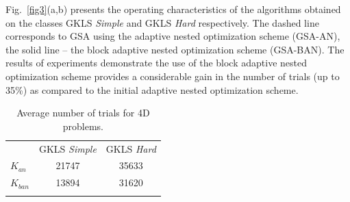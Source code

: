 \documentclass[runningheads]{llncs}
\begin{document}
Fig.~\ref{fig3}(a,b) presents the operating characteristics of the algorithms obtained on the classes GKLS \textit{Simple} 
and GKLS \textit{Hard} respectively. The dashed line corresponds to GSA using the adaptive nested optimization 
scheme (GSA-AN), the solid line -- the block adaptive nested optimization scheme (GSA-BAN). 
The results of experiments demonstrate the use of the block adaptive nested optimization scheme provides a considerable 
gain in the number of trials (up to 35\%) as compared to the initial adaptive nested optimization scheme.

\begin{table}
\centering
\caption{Average number of trials for 4D problems.}\label{tab2}
\begin{tabular}{lcc}
\hline\noalign{\smallskip}
 &    GKLS \textit{Simple} &  GKLS \textit{Hard} \\
\noalign{\smallskip}\hline\noalign{\smallskip}
 $K_{an}$  &  21747 & 35633 \\
 $K_{ban}$ &  13894 & 31620 \\
\noalign{\smallskip}\hline
\end{tabular}
\end{table}
\end{document}
